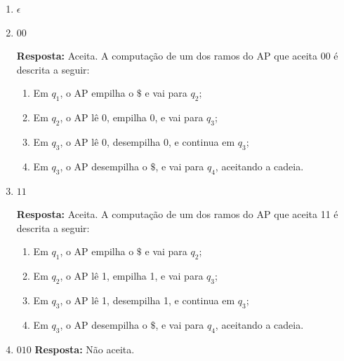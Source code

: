 \documentclass[12pt,a4paper,oneside]{article}
\begin{document}
\begin{enumerate}
\begin{enumerate}
\item $\epsilon$ 
\item $00$

\vspace*{0.3cm}

{\color{red} {\bf Resposta: } Aceita. A computação de um dos ramos do AP que aceita  00 é descrita a seguir:
	\begin{enumerate}
		\item Em $q_1$, o AP empilha o $\$$ e vai para $q_2$;
		\item Em $q_2$, o AP lê 0, empilha 0, e vai para $q_3$;
		\item Em $q_3$, o AP lê 0, desempilha 0, e continua em $q_3$;
		\item Em $q_3$, o AP desempilha o $\$$, e vai para $q_4$, aceitando a cadeia.		
	\end{enumerate}}

\item $11$

\vspace*{0.3cm}

{\color{red} {\bf Resposta: } Aceita. A computação de um dos ramos do AP que aceita  11 é descrita a seguir:
	\begin{enumerate}
		\item Em $q_1$, o AP empilha o $\$$ e vai para $q_2$;
		\item Em $q_2$, o AP lê 1, empilha 1, e vai para $q_3$;
		\item Em $q_3$, o AP lê 1, desempilha 1, e continua em $q_3$;
		\item Em $q_3$, o AP desempilha o $\$$, e vai para $q_4$, aceitando a cadeia.		
\end{enumerate}}

\item $010$ \hspace*{0.5cm} {\color{blue} {\bf Resposta: } Não aceita.}

\end{enumerate}

\end{enumerate}
\end{document}
